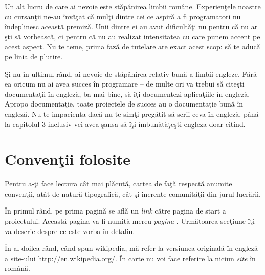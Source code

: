 
Un alt lucru de care ai nevoie este stăpânirea limbii române. Experienţele
noastre cu cursanţii ne-au învăţat că mulţi dintre cei ce aspiră a fi
programatori nu îndeplinesc această premiză. Unii dintre ei au avut dificultăţi
nu pentru că nu ar şti să vorbească, ci pentru că nu au realizat intensitatea
cu care punem accent pe acest aspect. Nu te teme, prima fază
de tutelare are exact acest scop: să te aducă pe linia de plutire.

Şi nu în ultimul rând, ai nevoie de stăpânirea relativ bună a limbii engleze.
Fără ea oricum nu ai avea succes în programare -- de multe ori va trebui
să citeşti documentaţii în engleză, ba mai bine, să îţi documentezi aplicaţiile
în engleză. Apropo documentaţie, toate proiectele de succes au o documentaţie
bună în engleză. Nu te impacienta dacă nu te simţi pregătit să scrii ceva în
engleză, până la capitolul 3 inclusiv vei avea şansa să îţi îmbunătăţeşti engleza
doar citind.

{}
\section*{Convenţii folosite}
Pentru a-ţi face lectura cât mai plăcută, cartea de faţă respectă anumite
convenţii, atât de natură tipografică, cât şi inerente comunităţii din jurul
lucrării.

În primul rând, pe prima pagină se află un \textsl{link} către pagina de
start a proiectului. Această pagină va fi numită mereu \textit{pagina \phpro}.
Următoarea secţiune îţi va descrie despre ce este vorba în detaliu.

În al doilea rând, când spun wikipedia, mă refer la versiunea originală
în engleză a site-ului \url{http://en.wikipedia.org/}. În carte nu voi face referire
la niciun \textsl{site} în română.


